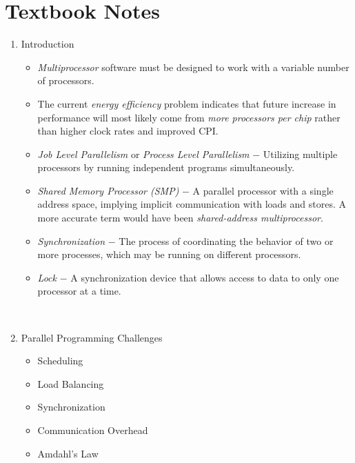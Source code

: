 \documentclass[12pt]{article}
\newenvironment{QandA}{\begin{enumerate}[label=\bfseries\arabic*.]\bfseries}
                      {\end{enumerate}}
\newenvironment{answered}{\par\quad\normalfont}{}
\begin{document}
\newpage

\section{Textbook Notes}
\begin{QandA}

\item Introduction
\begin{answered}
\vspace{-0.85cm}
\begin{itemize}
    \item \textit{Multiprocessor} software must be designed to work with a variable number of processors.
    \item The current \textit{energy efficiency} problem indicates that future increase in performance will most likely come from \textit{more processors per chip} rather than higher clock rates and improved CPI.
    \item \textit{Job Level Parallelism} or \textit{Process Level Parallelism} $-$ Utilizing multiple processors by running independent programs simultaneously.
    \item \textit{Shared Memory Processor (SMP)} $-$ A parallel processor with a single address space, implying implicit communication with loads and stores. A more accurate term would have been \textit{shared-address multiprocessor}. 
    \item \textit{Synchronization} $-$ The process of coordinating the behavior of two or more processes, which may be running on different processors.
    \item \textit{Lock} $-$ A synchronization device that allows access to data to only one processor at a time. 
\end{itemize}
\end{answered}

\

\item Parallel Programming Challenges
\begin{answered}
\vspace{-0.85cm}
\begin{itemize}
    \item Scheduling
    \item Load Balancing
    \item Synchronization
    \item Communication Overhead
    \item Amdahl's Law
\end{itemize}
\end{answered}


\end{QandA}
\end{document}
